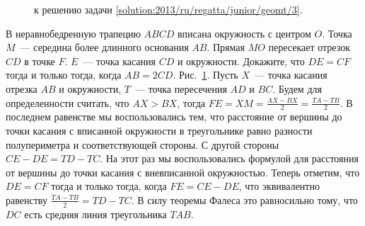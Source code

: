 \ifsolution
\begin{figure}\centering
    \caption{к решению задачи \ref{solution:2013/ru/regatta/junior/geomt/3}.}
    \label{fig:solution:2013/ru/regatta/junior/geomt/3}
\end{figure}
\fi %

\problem
В неравнобедренную трапецию $ABCD$ вписана окружность с центром $O$.
Точка $M$~--- середина более длинного основания $AB$.
Прямая $MO$ пересекает отрезок $CD$ в точке $F$.
$E$~--- точка касания $CD$ и окружности.
Докажите, что $DE = CF$ тогда и только тогда, когда $AB = 2 CD$.
\solution
\label{solution:2013/ru/regatta/junior/geomt/3}%
Рис.~\ref{fig:solution:2013/ru/regatta/junior/geomt/3}.
Пусть $X$~--- точка касания отрезка $AB$ и окружности, $T$~--- точка
пересечения $AD$ и $BC$.
Будем для определенности считать, что $AX > BX$, тогда
$FE = XM = \frac{AX - BX}{2} = \frac{TA - TB}{2}$.
В последнем равенстве мы воспользовались тем, что расстояние от вершины до
точки касания с вписанной окружности в треугольнике равно разности
полупериметра и соответствующей стороны.
С другой стороны $CE - DE = TD - TC$.
На этот раз мы воспользовались формулой для расстояния от вершины до точки
касания с вневписанной окружностью.
Теперь отметим, что $DE = CF$ тогда и только тогда, когда $FE = CE - DE$, что
эквивалентно равенству $\frac{TA - TB}{2} = TD - TC$.
В силу теоремы Фалеса это равносильно тому, что $DC$ есть средняя линия
треугольника $TAB$.
\endproblem
